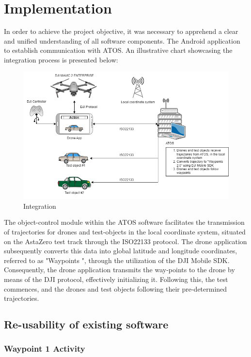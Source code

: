 \chapter{Implementation}
In order to achieve the project objective, it was necessary to apprehend a clear and unified understanding of all software components. 
The Android application to establish communication with ATOS. An illustrative chart showcasing the integration process is presented below:

\begin{figure}[H]
  \centering
  \includegraphics[width=\columnwidth]{figure/flow_config.png}
  \caption{Integration}
  \label{fig:ATOS-APP}
\end{figure}
The object-control module within the ATOS software facilitates the transmission of trajectories for drones and test-objects in the local coordinate system, situated on the AstaZero test track through the ISO22133 protocol. The drone application subsequently converts this data into global latitude and longitude coordinates, referred to as "Waypoints ", through the utilization of the DJI Mobile SDK. Consequently, the drone application transmits the way-points to the drone by means of the DJI protocol, effectively initializing it. Following this, the test commences, and the drones and test objects following their pre-determined trajectories.

\section{Re-usability of existing software}

\subsection{Waypoint 1 Activity}
